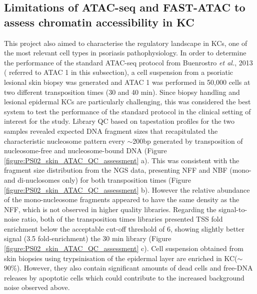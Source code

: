 \subsection{Limitations of ATAC-seq and FAST-ATAC to assess chromatin accessibility in KC}
This project also aimed to characterise the regulatory landscape in KCs, one of the most relevant cell types in psoriasis pathophysiology. In order to determine the performance of the standard ATAC-seq protocol from Buenrostro \textit{et al.}, 2013 ( referred to ATAC 1 in this subsection), a cell suspension from a psoriatic lesional skin biopsy was generated and ATAC 1 was performed in 50,000 cells at two different transposition times (30 and 40 min). Since biopsy handling and lesional epidermal KCs are particularly challenging, this was considered the best system to test the performance of the standard protocol in the clinical setting of interest for the study. Library QC based on tapestation profiles for the two samples revealed expected DNA fragment sizes that recapitulated the characteristic nucleosome pattern every $\sim$200bp generated by transposition of nucleosome-free and nucleosome-bound DNA (Figure \ref{figure:PS02_skin_ATAC_QC_assessment} a). This was consistent with the fragment size distribution from the NGS data, presenting NFF and NBF (mono-and di-nuclosomes only) for both transposition times (Figure \ref{figure:PS02_skin_ATAC_QC_assessment} b). However the  relative abundance of the mono-nucleosome fragments appeared to have the same density as the NFF, which is not observed in higher quality libraries. Regarding the signal-to-noise ratio, both of the transposition times libraries presented TSS fold enrichment below the acceptable cut-off threshold of 6, showing slightly better signal (3.5 fold-enrichment) the 30 min library (Figure \ref{figure:PS02_skin_ATAC_QC_assessment} c). Cell suspension obtained from skin biopsies using trypsinisation of the epidermal layer are enriched in KC($\sim$90\%). However, they also contain significant amounts of dead cells and free-DNA releases by apoptotic cells which could contribute to the increased background noise observed above. 



